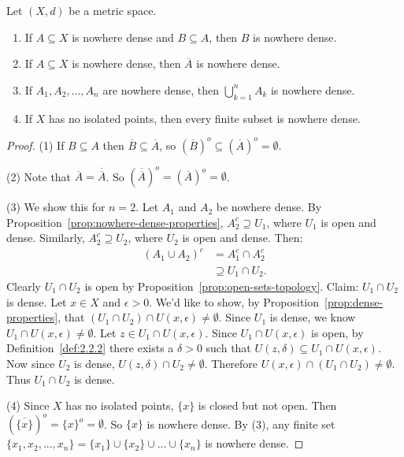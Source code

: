     \begin{proposition}
        Let $(X,d)$ be a metric space.
        \begin{enumerate}[label = (\arabic*),itemsep=1pt,topsep=3pt]
            \item If $A \subseteq X$ is nowhere dense and $B \subseteq A$, then $B$ is nowhere dense.
            \item If $A \subseteq X$ is nowhere dense, then $\overline{A}$ is nowhere dense.
            \item If $A_1,A_2,...,A_n$ are nowhere dense, then $\bigcup_{k = 1}^n A_k$ is nowhere dense.
            \item If $X$ has no isolated points, then every finite subset is nowhere dense.
        \end{enumerate}
    \end{proposition}
        \begin{proof}
            (1) If $B \subseteq A$ then $\overline{B} \subseteq \overline{A}$, so $(\overline{B})^o \subseteq (\overline{A})^o = \emptyset$.
            
            (2) Note that $\overline{A} = \overline{\overline{A}}$. So $(\overline{\overline{A}})^o = (\overline{A})^o = \emptyset$.

            (3) We show this for $n=2$. Let $A_1$ and $A_2$ be nowhere dense. By Proposition~\ref{prop:nowhere-dense-properties}, $A_2^c \supseteq U_1$, where $U_1$ is open and dense. Similarly, $A_2^c \supseteq U_2$, where $U_2$ is open and dense. Then:
                \begin{equation*}
                \begin{split}
                    (A_1 \cup A_2)^c 
                    & = A_1^c \cap A_2^c \\
                    & \supseteq U_1 \cap U_2.
                \end{split}
                \end{equation*}
            Clearly $U_1 \cap U_2$ is open by Proposition~\ref{prop:open-sets-topology}. Claim: $U_1 \cap U_2$ is dense. Let $x \in X$ and $\epsilon > 0$. We'd like to show, by Proposition~\ref{prop:dense-properties}, that $(U_1 \cap U_2) \cap U(x,\epsilon) \neq \emptyset$. Since $U_1$ is dense, we know $U_1 \cap U(x,\epsilon) \neq \emptyset$. Let $z \in U_1 \cap U(x,\epsilon)$. Since $U_1 \cap U(x,\epsilon)$ is open, by Definition~\ref{def:2.2.2} there exists a $\delta > 0$ such that $U(z,\delta) \subseteq U_1 \cap U(x,\epsilon)$. Now since $U_2$ is dense, $U(z,\delta) \cap U_2 \neq \emptyset$. Therefore $U(x,\epsilon) \cap (U_1 \cap U_2) \neq \emptyset$. Thus $U_1 \cap U_2$ is dense.

            (4) Since $X$ has no isolated points, $\{x\}$ is closed but not open. Then $(\overline{\{x\}})^o = \{x\}^o = \emptyset$. So $\{x\}$ is nowhere dense. By (3), any finite set $\{x_1,x_2,...,x_n\} = \{x_1\} \cup \{x_2\} \cup ... \cup \{x_n\}$ is nowhere dense.
        \end{proof}

